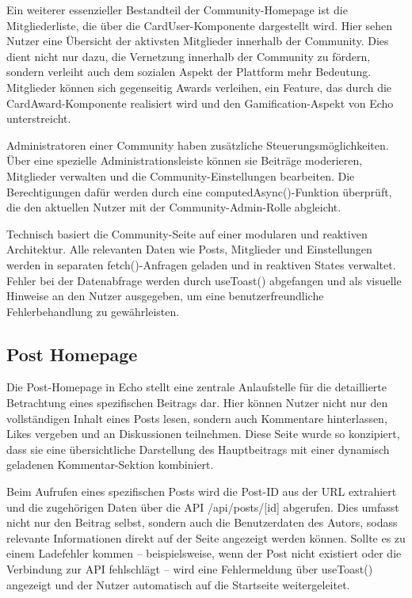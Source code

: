 \documentclass[a4paper,12pt]{article}
\begin{document}
Ein weiterer essenzieller Bestandteil der Community-Homepage ist die
Mitgliederliste, die über die CardUser-Komponente dargestellt wird. Hier sehen
Nutzer eine Übersicht der aktivsten Mitglieder innerhalb der Community. Dies
dient nicht nur dazu, die Vernetzung innerhalb der Community zu fördern,
sondern verleiht auch dem sozialen Aspekt der Plattform mehr Bedeutung.
Mitglieder können sich gegenseitig Awards verleihen, ein Feature, das durch die
CardAward-Komponente realisiert wird und den Gamification-Aspekt von Echo
unterstreicht.

Administratoren einer Community haben zusätzliche Steuerungsmöglichkeiten. Über
eine spezielle Administrationsleiste können sie Beiträge moderieren, Mitglieder
verwalten und die Community-Einstellungen bearbeiten. Die Berechtigungen dafür
werden durch eine computedAsync()-Funktion überprüft, die den aktuellen Nutzer
mit der Community-Admin-Rolle abgleicht.

Technisch basiert die Community-Seite auf einer modularen und reaktiven
Architektur. Alle relevanten Daten wie Posts, Mitglieder und Einstellungen
werden in separaten fetch()-Anfragen geladen und in reaktiven States verwaltet.
Fehler bei der Datenabfrage werden durch useToast() abgefangen und als visuelle
Hinweise an den Nutzer ausgegeben, um eine benutzerfreundliche Fehlerbehandlung
zu gewährleisten.

\newpage
\subsection{Post Homepage}
Die Post-Homepage in Echo stellt eine zentrale Anlaufstelle für die
detaillierte Betrachtung eines spezifischen Beitrags dar. Hier können Nutzer
nicht nur den vollständigen Inhalt eines Posts lesen, sondern auch Kommentare
hinterlassen, Likes vergeben und an Diskussionen teilnehmen. Diese Seite wurde
so konzipiert, dass sie eine übersichtliche Darstellung des Hauptbeitrags mit
einer dynamisch geladenen Kommentar-Sektion kombiniert.

Beim Aufrufen eines spezifischen Posts wird die Post-ID aus der URL extrahiert
und die zugehörigen Daten über die API /api/posts/[id] abgerufen. Dies umfasst
nicht nur den Beitrag selbst, sondern auch die Benutzerdaten des Autors, sodass
relevante Informationen direkt auf der Seite angezeigt werden können. Sollte es
zu einem Ladefehler kommen – beispielsweise, wenn der Post nicht existiert oder
die Verbindung zur API fehlschlägt – wird eine Fehlermeldung über useToast()
angezeigt und der Nutzer automatisch auf die Startseite weitergeleitet.
\end{document}
